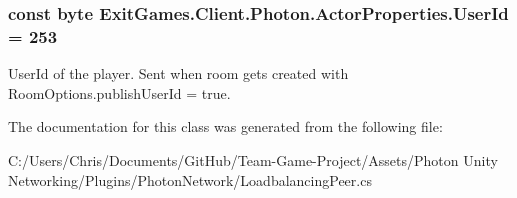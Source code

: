 \subsubsection[{\texorpdfstring{User\+Id}{UserId}}]{\setlength{\rightskip}{0pt plus 5cm}const byte Exit\+Games.\+Client.\+Photon.\+Actor\+Properties.\+User\+Id = 253}\hypertarget{class_exit_games_1_1_client_1_1_photon_1_1_actor_properties_adfc9d5eec7a43fee4bbf227d6bb0451f}{}\label{class_exit_games_1_1_client_1_1_photon_1_1_actor_properties_adfc9d5eec7a43fee4bbf227d6bb0451f}


User\+Id of the player. Sent when room gets created with Room\+Options.\+publish\+User\+Id = true.



The documentation for this class was generated from the following file\+:\begin{DoxyCompactItemize}
\item 
C\+:/\+Users/\+Chris/\+Documents/\+Git\+Hub/\+Team-\/\+Game-\/\+Project/\+Assets/\+Photon Unity Networking/\+Plugins/\+Photon\+Network/Loadbalancing\+Peer.\+cs\end{DoxyCompactItemize}
